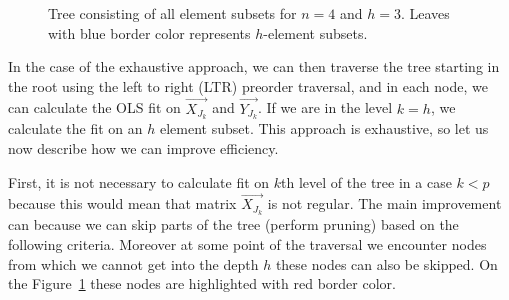 \begin{figure}[h]
\centering

\begin{center}
\end{center}


\caption{Tree consisting of all element subsets for $n=4$ and $h=3$. Leaves with blue border color represents $h$-element subsets.}
\label{figure:full:tree}
\end{figure}


In the case of the exhaustive approach, we can then traverse the tree starting in the root using the left to right (LTR) preorder traversal, and in each node, we can calculate the OLS fit on $\vec{ X_{J_k} }$ and $\vec{ Y_{J_k} }$. If we are in the level $k = h$, we calculate the fit on an $h$ element subset. This approach is exhaustive, so let us now describe how we can improve efficiency. 

First, it is not necessary to calculate fit on $k$th level of the tree in a case $k < p$ because this would mean that matrix $\vec{ X_{J_k} }$ is not regular. The main improvement can because we can skip parts of the tree (perform pruning) based on the following criteria. Moreover at some point of the traversal we encounter nodes from which we cannot get into the depth $h$ these nodes can also be skipped. On the Figure~\ref{figure:full:tree} these nodes are highlighted with red border color. 


